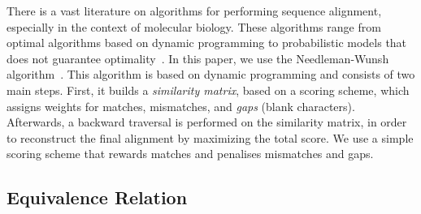 
There is a vast literature on algorithms for performing sequence alignment,
especially in the context of molecular biology.
These algorithms range from optimal algorithms based on dynamic programming to
probabilistic models that does not guarantee
optimality~\cite{needleman70,smith81,carrillo88,hickey11}. 
In this paper, we use the Needleman-Wunsh algorithm~\cite{needleman70}.
This algorithm is based on dynamic programming and consists of two main steps.
First, it builds a \textit{similarity matrix}, based on a scoring scheme, which
assigns weights for matches, mismatches, and \textit{gaps} (blank characters).
Afterwards, a backward traversal is performed on the similarity matrix, in order
to reconstruct the final alignment by maximizing the total score.
We use a simple scoring scheme that rewards matches and penalises mismatches and
gaps.


\subsection{Equivalence Relation}

